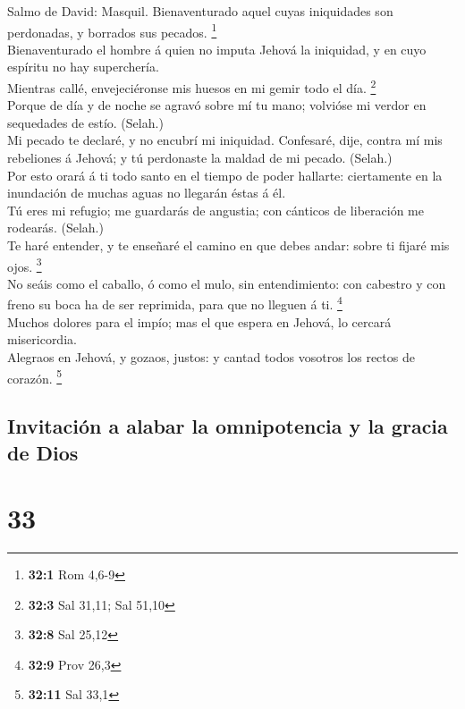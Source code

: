  Salmo de David: Masquil. Bienaventurado aquel cuyas
iniquidades son perdonadas, y borrados sus pecados. \footnote{\textbf{32:1}
  Rom 4,6-9}\\
 Bienaventurado el hombre á quien no imputa Jehová la
iniquidad, y en cuyo espíritu no hay superchería.\\
 Mientras callé, envejeciéronse mis huesos en mi gemir todo
el día. \footnote{\textbf{32:3} Sal 31,11; Sal 51,10}\\
 Porque de día y de noche se agravó sobre mí tu mano;
volvióse mi verdor en sequedades de estío. (Selah.)\\
 Mi pecado te declaré, y no encubrí mi iniquidad. Confesaré,
dije, contra mí mis rebeliones á Jehová; y tú perdonaste la maldad de mi
pecado. (Selah.)\\
 Por esto orará á ti todo santo en el tiempo de poder
hallarte: ciertamente en la inundación de muchas aguas no llegarán éstas
á él.\\
 Tú eres mi refugio; me guardarás de angustia; con cánticos
de liberación me rodearás. (Selah.)\\
 Te haré entender, y te enseñaré el camino en que debes
andar: sobre ti fijaré mis ojos. \footnote{\textbf{32:8} Sal 25,12}\\
 No seáis como el caballo, ó como el mulo, sin
entendimiento: con cabestro y con freno su boca ha de ser reprimida,
para que no lleguen á ti. \footnote{\textbf{32:9} Prov 26,3}\\
 Muchos dolores para el impío; mas el que espera en Jehová,
lo cercará misericordia.\\
 Alegraos en Jehová, y gozaos, justos: y cantad todos
vosotros los rectos de corazón. \footnote{\textbf{32:11} Sal 33,1}

\hypertarget{invitaciuxf3n-a-alabar-la-omnipotencia-y-la-gracia-de-dios}{%
\subsection{Invitación a alabar la omnipotencia y la gracia de
Dios}\label{invitaciuxf3n-a-alabar-la-omnipotencia-y-la-gracia-de-dios}}

\hypertarget{section-32}{%
\section{33}\label{section-32}}

